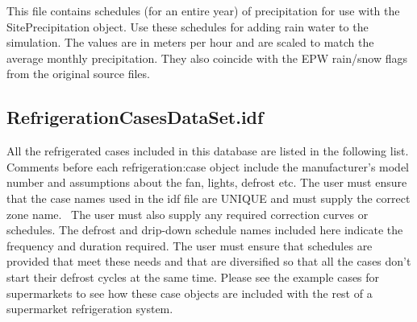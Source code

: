 This file contains schedules (for an entire year) of precipitation for use with the SitePrecipitation object. Use these schedules for adding rain water to the simulation. The values are in meters per hour and are scaled to match the average monthly precipitation. They also coincide with the EPW rain/snow flags from the original source files.

\subsection{RefrigerationCasesDataSet.idf}\label{refrigerationcasesdataset.idf}

All the refrigerated cases included in this database are listed in the following list. Comments before each refrigeration:case object include the manufacturer's model number and assumptions about the fan, lights, defrost etc. The user must ensure that the case names used in the idf file are UNIQUE and must supply the correct zone name.~ The user must also supply any required correction curves or schedules. The defrost and drip-down schedule names included here indicate the frequency and duration required. The user must ensure that schedules are provided that meet these needs and that are diversified so that all the cases don't start their defrost cycles at the same time. Please see the example cases for supermarkets to see how these case objects are included with the rest of a supermarket refrigeration system.

